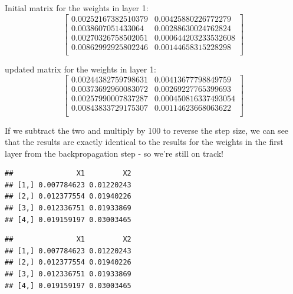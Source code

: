 Initial matrix for the weights in layer 1: \[\begin{bmatrix}
0.00252167382510379&0.00425880226772279 \\
0.0038607051433064&0.00288630024762824 \\
0.00270326758502051&0.000644203233532608 \\
0.00862992925802246&0.00144658315228298 \\
\end{bmatrix}\]

updated matrix for the weights in layer 1: \[\begin{bmatrix}
0.00244382759798631&0.00413677798849759 \\
0.00373692960083072&0.00269227765399693 \\
0.00257990007837287&0.000450816337493054 \\
0.00843833729175307&0.00114623668063622 \\
\end{bmatrix}\]

If we subtract the two and multiply by 100 to reverse the step size, we
can see that the results are exactly identical to the results for the
weights in the first layer from the backpropagation step - so we're
still on track!

\begin{Shaded}
\begin{Highlighting}[]
\NormalTok{(init\_params[[}\NormalTok{]] }\SpecialCharTok{{-}}\NormalTok{ update\_params[[}\NormalTok{]])}\SpecialCharTok{*}
\end{Highlighting}
\end{Shaded}

\begin{verbatim}
##               X1         X2
## [1,] 0.007784623 0.01220243
## [2,] 0.012377554 0.01940226
## [3,] 0.012336751 0.01933869
## [4,] 0.019159197 0.03003465
\end{verbatim}

\begin{Shaded}
\begin{Highlighting}[]
\NormalTok{back[[}\NormalTok{]]}
\end{Highlighting}
\end{Shaded}

\begin{verbatim}
##               X1         X2
## [1,] 0.007784623 0.01220243
## [2,] 0.012377554 0.01940226
## [3,] 0.012336751 0.01933869
## [4,] 0.019159197 0.03003465
\end{verbatim}

